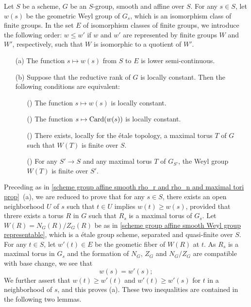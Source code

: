 \begin{theorem}\label{scheme group affine smooth Weyl group variation prop}
Let $S$ be a scheme, $G$ be an $S$-group, smooth and affine over $S$. For any $s\in S$, let $w(s)$ be the geometric Weyl group of $G_s$, which is an isomorphism class of finite groups. In the set $E$ of isomorphism classes of finite groups, we introduce the following order: $w\leq w'$ if $w$ and $w'$ are represented by finite groups $W$ and $W'$, respectively, such that $W$ is isomorphic to a quotient of $W'$.
\begin{enumerate}
    \item[(a)] The function $s\mapsto w(s)$ from $S$ to $E$ is lower semi-continuous.
    \item[(b)] Suppose that the reductive rank of $G$ is locally constant. Then the following conditions are equivalent:
    \begin{enumerate}
        \item[(\rmnum{1})] The function $s\mapsto w(s)$ is locally constant.
        \item[(\rmnum{2})] The function $s\mapsto\mathrm{Card}(w(s))$ is locally constant.
        \item[(\rmnum{3})] There exists, locally for the \'etale topology, a maximal torus $T$ of $G$ such that $W(T)$ is finite over $S$.
        \item[(\rmnum{4})] For any $S'\to S$ and any maximal torus $T$ of $G_{S'}$, the Weyl group $W(T)$ is finite over $S'$.
    \end{enumerate}
\end{enumerate}
\end{theorem}

Preceding as in \cref{scheme group affine smooth rho_r and rho_n and maximal tori prop}~(a), we are reduced to prove that for any $s\in S$, there exists an open neighborhood $U$ of $s$ such that $t\in U$ implies $w(t)\geq w(s)$, provided that threre exists a torus $R$ in $G$ such that $R_s$ is a maximal torus of $G_s$. Let $W(R)=N_G(R)/Z_G(R)$ be as in \cref{scheme group affine smooth Weyl group representable}, which is a \'etale group scheme, separated and quasi-finite over $S$. For any $t\in S$, let $w'(t)\in E$ be the geometic fiber of $W(R)$ at $t$. As $R_s$ is a maximal torus in $G_s$ and the formation of $N_G$, $Z_G$ and $N_G/Z_G$ are compatible with base change, we see that
\[w(s)=w'(s);\]
We further assert that $w(t)\geq w'(t)$ and $w'(t)\geq w'(s)$ for $t$ in a neighborhood of $s$, and this proves (a). These two inequalities are contained in the following two lemmas.

